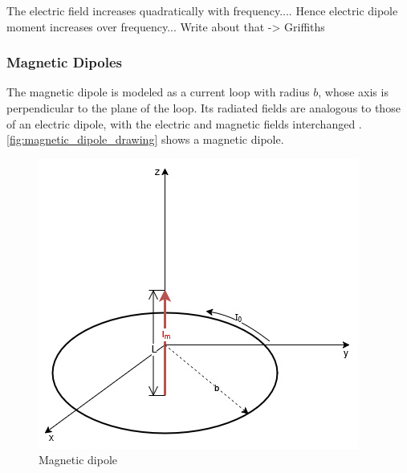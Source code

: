 The electric field increases quadratically with frequency.... Hence electric dipole moment increases over frequency... Write about that -> Griffiths




\subsubsection{Magnetic Dipoles}

The magnetic dipole is modeled as a current loop with radius $b$, whose axis is perpendicular to the plane of the loop. Its radiated fields are analogous to those of an electric dipole, with the electric and magnetic fields interchanged \cite{Balanis_1997}. \autoref{fig:magnetic_dipole_drawing} shows a magnetic dipole.

\begin{figure}[h]
    \centering
    \includegraphics[width=0.5\linewidth]{Documentation//content//10_theory//img/magnetic_dipole_drawing.png}
    \caption{Magnetic dipole}
    \label{fig:magnetic_dipole_drawing}
\end{figure}

